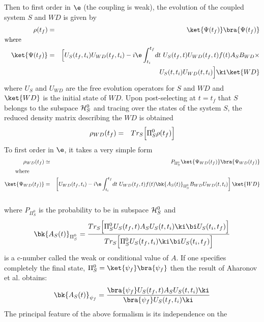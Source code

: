 \documentclass[12pt]{article}
\begin{document}
Then to first order in $\e$ (the coupling is weak), the evolution of the
coupled
system $S$ and $WD$ is given by
 \begin{eqnarray}
\rho(t_f)& =&\ket{\Psi (t_f)}\bra{\Psi(t_f)}\nonumber\\
\mbox{where}\quad \quad \quad\quad&&\nonumber\\
\ket{\Psi(t_f)}& =& \Bigl [
U_S(t_f,t_i)U_{WD}(t_f,t_i) - i\e \int_{t_i}^{t_f}\! dt \
 U_S(t_f,t)U_{WD}(t_f,t)  f(t) A_S B_{WD}\times \Bigr. \nonumber\\
&& \quad \quad \Bigl.
  U_S(t,t_i)U_{WD}(t,t_i) \Bigr] \ki \ket{WD}
\label{weakiii}
 \end{eqnarray}
where $U_S$ and $U_{WD}$ are
the free evolution operators for $S$ and  $WD$ and  $\ket{WD}$ is the initial
state of  $WD$. Upon post-selecting at $t=t_f$ that $S$ belongs to the
subspace ${\cal H}_S^{0}$ and tracing over the  states of the
system $S$, the reduced density matrix describing the $WD$ is obtained
\begin{eqnarray}
 \rho_{WD}(t_f) &=& Tr_S
 \Bigl [ \Pi_S^0 \rho(t_f)
\Bigr]\end{eqnarray}
To first order in $\e$, it takes a very simple
form \begin{eqnarray}
 \rho_{WD}(t_f)&\simeq &
P_{\Pi_S^{0}}\ket{\Psi_{WD}(t_f)}
\bra{\Psi_{WD}(t_f)}\nonumber\\
\mbox{where}\quad \  \ \quad&&\nonumber\\
\ket{\Psi_{WD}(t_f)}&=&
\left[ U_{WD}(t_f,t_i) -
 i\e
\int_{t_i}^{t_f}\! dt \ U_{WD}(t_f,t)  f(t) \bk{A_{S}(t)}_{\Pi_S^{0}}
B_{WD}U_{WD}(t,t_i)
 \right] \ket{WD}\nonumber\\
&&\label{weakiv}
 \end{eqnarray}
where $P_{\Pi_S^{0}}$ is the probability to be in subspace ${\cal H}_S^{0}$
and
  \begin{equation}
\bk{A_{S}(t)}_{\Pi_S^{0}} = {Tr_S
\Bigl [ \Pi_S^{0} U_S(t_f,t) A_S U_S(t,t_i) \ki\bi U_S(t_i,t_f) \Bigr]
\over Tr_S \Bigl [ \Pi_S^{0} U_S(t_f,t_i)\ki\bi U_S(t_i,t_f) \Bigr]}
\label{weakv}
\end{equation}
 is a c-number called  the weak or conditional value of $A$. If
one specifies completely the final state, $\Pi_S^{0} =
\ket{\psi_f}\bra{\psi_f}$  then
the result of Aharonov et al.
obtains:
\begin{equation}
\bk{A_{S}(t)}_{\psi_f} = {\bra{\psi_f}
U_S(t_f,t) A_S U_S(t,t_i) \ki  \over \bra{\psi_f} U_S(t_f,t_i) \ki}
\label{weakvi}
 \end{equation}
The principal feature of the above formalism is its independence on the
\end{document}
